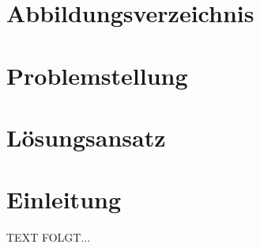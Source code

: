 \documentclass[a4paper,12pt,oneside]{article}
\begin{document}
  \newpage
  
  \tableofcontents
  
  \newpage
  \pagestyle{fancy} %
 
  \section*{Abbildungsverzeichnis}
  \renewcommand{\listfigurename}{} %
  \thispagestyle{empty}
  \listoffigures
  
  \newpage
  
  
  
  \newpage

  \section{Problemstellung}\label{kap_problemstellung}
  

  \section{Lösungsansatz}\label{kap_loesungsansatz}
  

  \section{Einleitung}\label{kap_einleitung}
   TEXT FOLGT...
   
\end{document}

